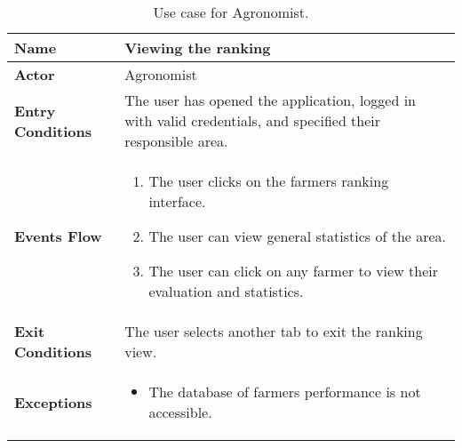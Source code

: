 
\begin{table}[hbt!]
\centering
\caption{\label{tab:addOne{figure_counter}}Use case for Agronomist.}

\begin{tabular}{|l|>{\raggedright\arraybackslash}m{12cm}|}

    \hline
    \textbf{Name} & Viewing the ranking\\
    \hline
   	\textbf{Actor} & Agronomist\\
    \hline
    
    \textbf{Entry Conditions} & The user has opened the application, logged in with valid credentials, and specified their responsible area. \\
    \hline
    \textbf{Events Flow} & \begin{enumerate}
            \item The user clicks on the farmers ranking interface.
            \item The user can view general statistics of the area.
            \item The user can click on any farmer to view their evaluation and statistics.
       \end{enumerate}\\
    \hline
    \textbf{Exit Conditions} & The user selects another tab to exit the ranking view.\\
    \hline
    \textbf{Exceptions} & 
       \begin{itemize}
          \item The database of farmers performance is not accessible.%
        \end{itemize}
     \\
    \hline
\end{tabular}
\end{table}